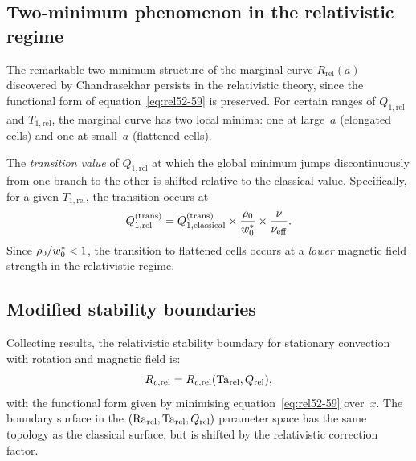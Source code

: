 \subsection{Two-minimum phenomenon in the relativistic regime}
\label{sec:two-minima}

The remarkable two-minimum structure of the marginal curve
$R_{\mathrm{rel}}(a)$ discovered by Chandrasekhar persists in the
relativistic theory, since the functional form of
equation~\eqref{eq:rel52-59} is preserved.  For certain ranges of
$Q_{1,\mathrm{rel}}$ and $T_{1,\mathrm{rel}}$, the marginal curve
has two local minima: one at large~$a$ (elongated cells) and one at
small~$a$ (flattened cells).

The \emph{transition value} of $Q_{1,\mathrm{rel}}$ at which the
global minimum jumps discontinuously from one branch to the other is
shifted relative to the classical value.  Specifically, for a given
$T_{1,\mathrm{rel}}$, the transition occurs at
\begin{equation}
  Q_{1,\mathrm{rel}}^{(\mathrm{trans})}
  = Q_{1,\mathrm{classical}}^{(\mathrm{trans})}
    \times \frac{\rho_{0}}{w^{*}_{0}}
    \times \frac{\nu}{\nu_{\mathrm{eff}}}.
  \label{eq:rel52-Qtrans}
\end{equation}
Since $\rho_{0}/w^{*}_{0} < 1$, the transition to flattened
cells occurs at a \emph{lower} magnetic field strength in the
relativistic regime.

\subsection{Modified stability boundaries}
\label{sec:modified-boundaries}

Collecting results, the relativistic stability boundary for stationary
convection with rotation and magnetic field is:
\begin{equation}
  R_{c,\mathrm{rel}} = R_{c,\mathrm{rel}}(\mathrm{Ta}_{\mathrm{rel}}, Q_{\mathrm{rel}}),
  \label{eq:rel52-boundary}
\end{equation}
with the functional form given by minimising
equation~\eqref{eq:rel52-59} over~$x$.  The boundary surface in the
$(\mathrm{Ra}_{\mathrm{rel}}, \mathrm{Ta}_{\mathrm{rel}}, Q_{\mathrm{rel}})$ parameter space has the same topology as the
classical surface, but is shifted by the relativistic correction
factor.

